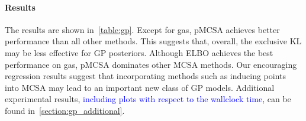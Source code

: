 \vspace{-1.8ex}
\paragraph{Results}
The results are shown in~\cref{table:gp}.
Except for \textsf{gas}, pMCSA achieves better performance than all other methods.
This suggests that, overall, the exclusive KL may be less effective for GP posteriors.
Although ELBO achieves the best performance on \textsf{gas}, pMCSA dominates other MCSA methods.
Our encouraging regression results suggest that incorporating methods such as inducing points~\citep{NIPS2005_4491777b} into MCSA may lead to an important new class of GP models.
Additional experimental results, \textcolor{blue}{including plots with respect to the wallclock time}, can be found in~\cref{section:gp_additional}.

